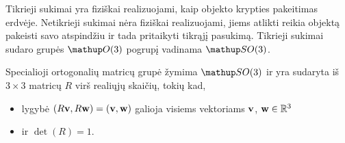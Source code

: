 Tikrieji sukimai yra fiziškai realizuojami,
kaip objekto krypties pakeitimas erdvėje.
Netikrieji sukimai nėra fiziškai realizuojami,
jiems atlikti reikia objektą pakeisti savo atspindžiu
ir tada pritaikyti tikrąjį pasukimą.
Tikrieji sukimai sudaro grupės $\Orth3$ pogrupį vadinama $\SO3$.

\begin{definition}
	Specialioji ortogonalių matricų grupė žymima $\SO3$ ir yra sudaryta iš
	$3\times3$ matricų $R$ virš realiųjų skaičių, tokių kad,
	\begin{itemize}
		\item lygybė $(R \vb v, R \vb w) = (\vb v, \vb w)$
			galioja visiems vektoriams 
			$\vb v$, $\vb w \in \mathbb{R}^3$ 
		\item ir $\det(R) = 1$.
	\end{itemize}
\end{definition}


